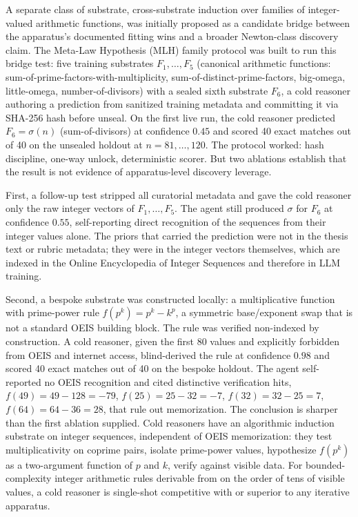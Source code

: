 \documentclass[11pt]{article}
\begin{document}
A separate class of substrate, cross-substrate induction over families of integer-valued arithmetic functions, was initially proposed as a candidate bridge between the apparatus's documented fitting wins and a broader Newton-class discovery claim. The Meta-Law Hypothesis (MLH) family protocol was built to run this bridge test: five training substrates $F_1, \ldots, F_5$ (canonical arithmetic functions: sum-of-prime-factors-with-multiplicity, sum-of-distinct-prime-factors, big-omega, little-omega, number-of-divisors) with a sealed sixth substrate $F_6$, a cold reasoner authoring a prediction from sanitized training metadata and committing it via SHA-256 hash before unseal. On the first live run, the cold reasoner predicted $F_6 = \sigma(n)$ (sum-of-divisors) at confidence $0.45$ and scored 40 exact matches out of 40 on the unsealed holdout at $n = 81, \ldots, 120$. The protocol worked: hash discipline, one-way unlock, deterministic scorer. But two ablations establish that the result is not evidence of apparatus-level discovery leverage.

First, a follow-up test stripped all curatorial metadata and gave the cold reasoner only the raw integer vectors of $F_1, \ldots, F_5$. The agent still produced $\sigma$ for $F_6$ at confidence $0.55$, self-reporting direct recognition of the sequences from their integer values alone. The priors that carried the prediction were not in the thesis text or rubric metadata; they were in the integer vectors themselves, which are indexed in the Online Encyclopedia of Integer Sequences and therefore in LLM training.

Second, a bespoke substrate was constructed locally: a multiplicative function with prime-power rule $f(p^k) = p^k - k^p$, a symmetric base/exponent swap that is not a standard OEIS building block. The rule was verified non-indexed by construction. A cold reasoner, given the first 80 values and explicitly forbidden from OEIS and internet access, blind-derived the rule at confidence $0.98$ and scored 40 exact matches out of 40 on the bespoke holdout. The agent self-reported no OEIS recognition and cited distinctive verification hits, $f(49) = 49 - 128 = -79$, $f(25) = 25 - 32 = -7$, $f(32) = 32 - 25 = 7$, $f(64) = 64 - 36 = 28$, that rule out memorization. The conclusion is sharper than the first ablation supplied. Cold reasoners have an algorithmic induction substrate on integer sequences, independent of OEIS memorization: they test multiplicativity on coprime pairs, isolate prime-power values, hypothesize $f(p^k)$ as a two-argument function of $p$ and $k$, verify against visible data. For bounded-complexity integer arithmetic rules derivable from on the order of tens of visible values, a cold reasoner is single-shot competitive with or superior to any iterative apparatus.
\end{document}
